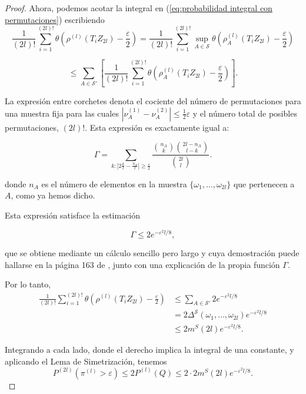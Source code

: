 \documentclass{report}
\begin{document}
\begin{proof}
Ahora, podemos acotar la integral en (\ref{eq:probabilidad integral con permutaciones}) escribiendo
\[
\frac{1}{(2l)!} \sum_{i=1}^{(2l)!} \theta \left(  \rho^{(l)}(T_i Z_{2l}) - \frac{\varepsilon}{2}  \right)
= \frac{1}{(2l)!} \sum_{i=1}^{(2l)!} \sup_{A \in \mathcal{S}} \theta \left(  \rho^{(l)}_A(T_i Z_{2l}) - \frac{\varepsilon}{2}  \right)
\]

\[
\leq \sum_{A \in \mathcal{S}'} \left[ \frac{1}{(2l)!} \sum_{i=1}^{(2l)!} \theta \left(  \rho^{(l)}_A(T_i Z_{2l}) - \frac{\varepsilon}{2}  \right) \right].
\]

La expresión entre corchetes denota el cociente del número de permutaciones para una muestra fija
para las cuales \( |\nu^{(1)}_A - \nu^{(2)}_A| \leq \frac{1}{2} \varepsilon \) y el número total de posibles permutaciones, $(2l)!$. Esta expresión
es exactamente igual a:

\[
\Gamma = \sum_{k : |2\frac{k}{l} - \frac{n_A}{l}| \geq \frac{\varepsilon}{2}} \frac{\binom{n_A}{k} \binom{2l - n_A}{l - k}}{\binom{2l}{l}}.
\]

donde \( n_A \) es el número de elementos en la muestra \( \{\omega_1, \dots, \omega_{2l}\} \) que pertenecen a \( A \), como ya hemos dicho.

Esta expresión satisface la estimación

\[
\Gamma \leq 2 e^{-\varepsilon^2 l / 8},
\]

que se obtiene mediante un cálculo sencillo pero largo y cuya demostración puede hallarse en la página 163 de \cite{vapnik1998}, junto con una explicación de la propia función $\Gamma$.

Por lo tanto,
\begin{equation}\label{promedio de tita acotado por la funcion de crecimiento}
\begin{aligned}
\frac{1}{(2l)!} \sum_{i=1}^{(2l)!} \theta \left(  \rho^{(l)}(T_i Z_{2l}) - \frac{\varepsilon}{2} \right)
&\leq \sum_{A \in \mathcal{S}'} 2 e^{-\varepsilon^2 l / 8} \\
&= 2 \Delta^{\mathcal{S}}(\omega_1, \dots, \omega_{2l}) e^{-\varepsilon^2 l / 8}\\
&\leq 2 m^S(2l) e^{-\varepsilon^2 l / 8}.
\end{aligned}
\end{equation}

Integrando a cada lado, donde el derecho implica la integral de una constante, y aplicando el Lema de Simetrización, tenemos
\[
P^{(2l)}\left(\pi^{(l)}>\varepsilon\right) \leq 2 P^{(l)}(Q) \leq 2 \cdot 2 m^S(2l) e^{-\varepsilon^2 l / 8}.
\]

\end{proof}
\end{document}
